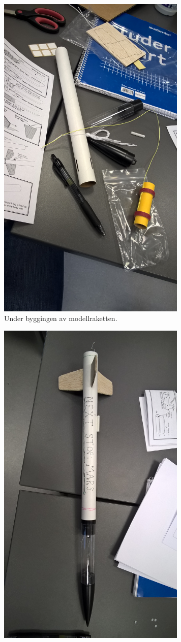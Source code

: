 \documentclass[norsk,a4paper,12pt]{article}
\begin{document}
\begin{figure}[H]
\centering
\begin{subfigure}{.5\textwidth}
  \centering
  \includegraphics[width=90mm]{modelrocket1.jpg}
  \caption{Under byggingen av modellraketten.}
  \label{fig:sub1}
\end{subfigure}
\begin{subfigure}{.5\textwidth}
  \centering
  \includegraphics[width=90mm]{modelrocket2.jpg}

\end{subfigure}
\end{figure}
\end{document}
